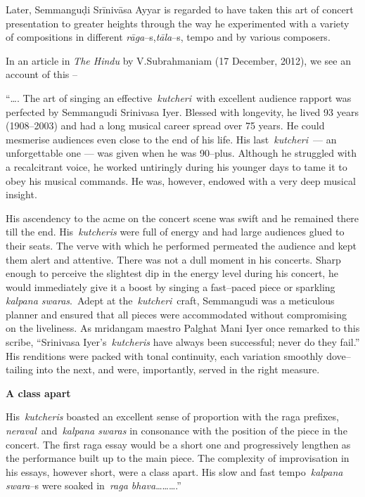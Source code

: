 Later, Semmanguḍi Srīnivāsa Ayyar is regarded to have taken this art of concert presentation to greater heights through the way he experimented with a variety of compositions in different \textit{rāga}–s,\break \textit{tāla}–s, tempo and by various composers.

In an article in \textit{The Hindu} by V.Subrahmaniam (17 December, 2012), we see an account of this –

\begin{myquote}
“…. The art of singing an effective \textit{kutcheri} with excellent audience rapport was perfected by Semmangudi Srinivasa Iyer. Blessed with longevity, he lived 93 years (1908–2003) and had a long musical career spread over 75 years. He could mesmerise audiences even close to the end of his life. His last \textit{kutcheri} — an unforgettable one — was given when he was 90–plus. Although he struggled with a recalcitrant voice, he worked untiringly during his younger days to tame it to obey his musical commands. He was, however, endowed with a very deep musical insight.
\end{myquote}

\begin{myquote}
His ascendency to the acme on the concert scene was swift and he remained there till the end. His \textit{kutcheris} were full of energy and had large audiences glued to their seats. The verve with which he performed permeated the audience and kept them alert and attentive. There was not a dull moment in his concerts. Sharp enough to perceive the slightest dip in the energy level during his concert, he would immediately give it a boost by singing a fast–paced piece or sparkling \textit{kalpana swaras}. Adept at the \textit{kutcheri} craft, Semmangudi was a meticulous planner and ensured that all pieces were accommodated without compromising on the liveliness. As mridangam maestro Palghat Mani Iyer once remarked to this scribe, “Srinivasa Iyer’s \textit{kutcheris} have always been successful; never do they fail.” His renditions were packed with tonal continuity, each variation smoothly dove–tailing into the next, and were, importantly, served in the right measure.
\end{myquote}

\textbf{A class apart}

\begin{myquote}
His \textit{kutcheris} boasted an excellent sense of proportion with the raga prefixes, \textit{neraval} and \textit{kalpana swaras} in consonance with the position of the piece in the concert. The first raga essay would be a short one and progressively lengthen as the performance built up to the main piece. The complexity of improvisation in his essays, however short, were a class apart. His slow and fast tempo \textit{kalpana swara}–s were soaked in \textit{raga bhava}……….”
\end{myquote}


